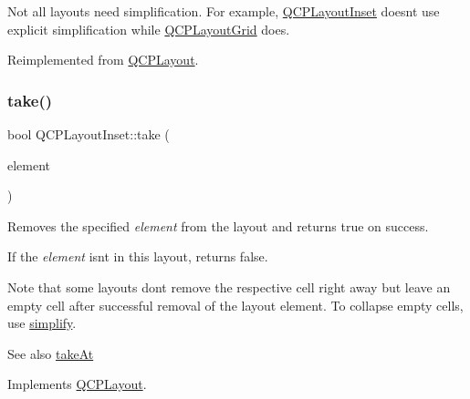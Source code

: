 Not all layouts need simplification. For example, \hyperlink{class_q_c_p_layout_inset}{Q\+C\+P\+Layout\+Inset} doesn\textquotesingle{}t use explicit simplification while \hyperlink{class_q_c_p_layout_grid}{Q\+C\+P\+Layout\+Grid} does. 

Reimplemented from \hyperlink{class_q_c_p_layout_a41e6ac049143866e8f8b4964efab01b2}{Q\+C\+P\+Layout}.

\mbox{\label{class_q_c_p_layout_inset_af7f13cc369f8190b5e7e17d5f39dfe1c}} 
\subsubsection{\texorpdfstring{take()}{take()}\hspace{0.1cm}{\footnotesize\ttfamily [1/2]}}
{\footnotesize\ttfamily bool Q\+C\+P\+Layout\+Inset\+::take (\begin{DoxyParamCaption}\item[{\hyperlink{class_q_c_p_layout_element}{Q\+C\+P\+Layout\+Element} $\ast$}]{element }\end{DoxyParamCaption})\hspace{0.3cm}{\ttfamily [virtual]}}

Removes the specified {\itshape element} from the layout and returns true on success.

If the {\itshape element} isn\textquotesingle{}t in this layout, returns false.

Note that some layouts don\textquotesingle{}t remove the respective cell right away but leave an empty cell after successful removal of the layout element. To collapse empty cells, use \hyperlink{class_q_c_p_layout_inset_a18b7d508f0baa60cc5dcb1343cf7f32a}{simplify}.

\begin{DoxySeeAlso}{See also}
\hyperlink{class_q_c_p_layout_inset_abf2e8233f5b7051220907e62ded490a2}{take\+At} 
\end{DoxySeeAlso}


Implements \hyperlink{class_q_c_p_layout_ada26cd17e56472b0b4d7fbbc96873e4c}{Q\+C\+P\+Layout}.

\mbox{\label{class_q_c_p_layout_inset_a1daf9fe747380dcd3cf8ef9deb470dc9}} 
